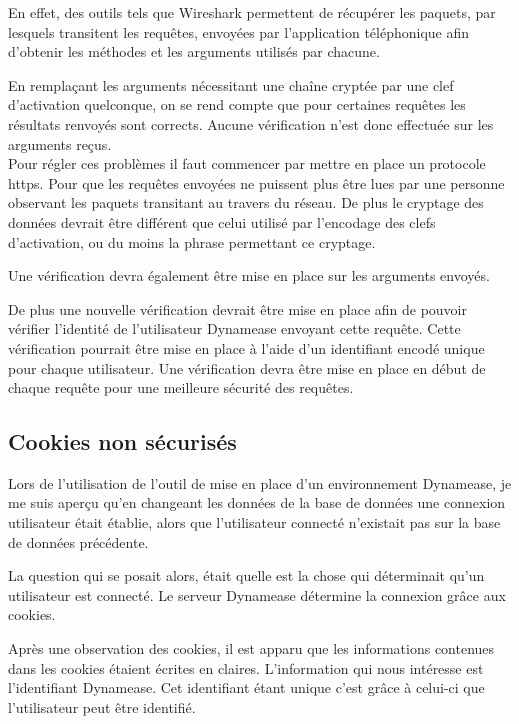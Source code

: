 En effet, des outils tels que Wireshark permettent de récupérer les paquets, par lesquels transitent les requêtes, envoyées par l'application téléphonique afin d'obtenir les méthodes et les arguments utilisés par chacune.

En remplaçant les arguments nécessitant une chaîne cryptée par une clef d'activation quelconque, on se rend compte que pour certaines requêtes les résultats renvoyés sont corrects. Aucune vérification n'est donc effectuée sur les arguments reçus.\\

Pour régler ces problèmes il faut commencer par mettre en place un protocole https. Pour que les requêtes envoyées ne puissent plus être lues par une personne observant les paquets transitant au travers du réseau. De plus le cryptage des données devrait être différent que celui utilisé par l'encodage des clefs d'activation, ou du moins la phrase permettant ce cryptage.

Une vérification devra également être mise en place sur les arguments envoyés.

De plus une nouvelle vérification devrait être mise en place afin de pouvoir vérifier l'identité de l'utilisateur Dynamease envoyant cette requête. Cette vérification pourrait être mise en place à l'aide d'un identifiant encodé unique pour chaque utilisateur. Une vérification devra être mise en place en début de chaque requête pour une meilleure sécurité des requêtes.

\subsection{Cookies non sécurisés}

Lors de l'utilisation de l'outil de mise en place d'un environnement Dynamease, je me suis aperçu qu'en changeant les données de la base de données une connexion utilisateur était établie, alors que l'utilisateur connecté n'existait pas sur la base de données précédente.

La question qui se posait alors, était quelle est la chose qui déterminait qu'un utilisateur est connecté. Le serveur Dynamease détermine la connexion grâce aux cookies.

Après une observation des cookies, il est apparu que les informations contenues dans les cookies étaient écrites en claires. L'information qui nous intéresse est l'identifiant Dynamease. Cet identifiant étant unique c'est grâce à celui-ci que l'utilisateur peut être identifié.

